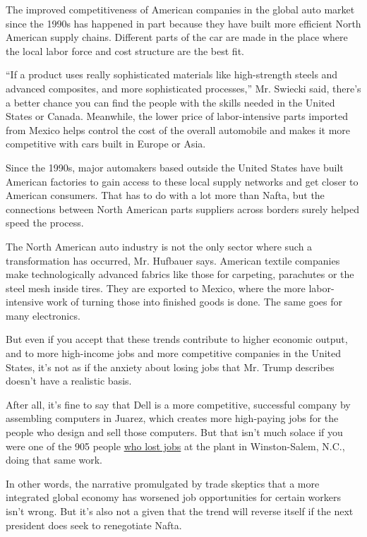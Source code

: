 The improved competitiveness of American companies in the global auto
market since the 1990s has happened in part because they have built more
efficient North American supply chains. Different parts of the car are
made in the place where the local labor force and cost structure are the
best fit.

``If a product uses really sophisticated materials like high-strength
steels and advanced composites, and more sophisticated processes,'' Mr.
Swiecki said, there's a better chance you can find the people with the
skills needed in the United States or Canada. Meanwhile, the lower price
of labor-intensive parts imported from Mexico helps control the cost of
the overall automobile and makes it more competitive with cars built in
Europe or Asia.

Since the 1990s, major automakers based outside the United States have
built American factories to gain access to these local supply networks
and get closer to American consumers. That has to do with a lot more
than Nafta, but the connections between North American parts suppliers
across borders surely helped speed the process.

The North American auto industry is not the only sector where such a
transformation has occurred, Mr. Hufbauer says. American textile
companies make technologically advanced fabrics like those for
carpeting, parachutes or the steel mesh inside tires. They are exported
to Mexico, where the more labor-intensive work of turning those into
finished goods is done. The same goes for many electronics.

But even if you accept that these trends contribute to higher economic
output, and to more high-income jobs and more competitive companies in
the United States, it's not as if the anxiety about losing jobs that Mr.
Trump describes doesn't have a realistic basis.

After all, it's fine to say that Dell is a more competitive, successful
company by assembling computers in Juarez, which creates more
high-paying jobs for the people who design and sell those computers. But
that isn't much solace if you were one of the 905 people
\href{http://www.wral.com/business/story/6156112/}{who lost jobs} at the
plant in Winston-Salem, N.C., doing that same work.

In other words, the narrative promulgated by trade skeptics that a more
integrated global economy has worsened job opportunities for certain
workers isn't wrong. But it's also not a given that the trend will
reverse itself if the next president does seek to renegotiate Nafta.


